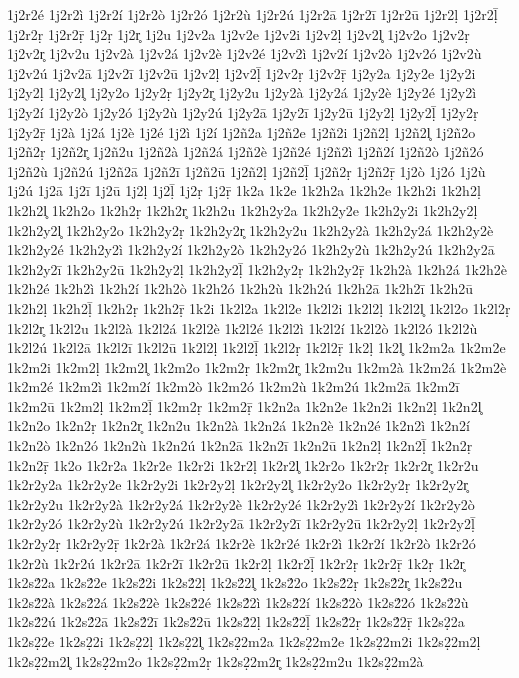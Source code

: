 {1j2r2é
1j2r2ì
1j2r2í
1j2r2ò
1j2r2ó
1j2r2ù
1j2r2ú
1j2r2ā
1j2r2ī
1j2r2ū
1j2r2ḷ
1j2r2ḹ
1j2r2ṛ
1j2r2ṝ
1j2ṛ
1j2r̥
1j2u
1j2v2a
1j2v2e
1j2v2i
1j2v2ḷ
1j2v2l̥
1j2v2o
1j2v2ṛ
1j2v2r̥
1j2v2u
1j2v2à
1j2v2á
1j2v2è
1j2v2é
1j2v2ì
1j2v2í
1j2v2ò
1j2v2ó
1j2v2ù
1j2v2ú
1j2v2ā
1j2v2ī
1j2v2ū
1j2v2ḷ
1j2v2ḹ
1j2v2ṛ
1j2v2ṝ
1j2y2a
1j2y2e
1j2y2i
1j2y2ḷ
1j2y2l̥
1j2y2o
1j2y2ṛ
1j2y2r̥
1j2y2u
1j2y2à
1j2y2á
1j2y2è
1j2y2é
1j2y2ì
1j2y2í
1j2y2ò
1j2y2ó
1j2y2ù
1j2y2ú
1j2y2ā
1j2y2ī
1j2y2ū
1j2y2ḷ
1j2y2ḹ
1j2y2ṛ
1j2y2ṝ
1j2à
1j2á
1j2è
1j2é
1j2ì
1j2í
1j2ñ2a
1j2ñ2e
1j2ñ2i
1j2ñ2ḷ
1j2ñ2l̥
1j2ñ2o
1j2ñ2ṛ
1j2ñ2r̥
1j2ñ2u
1j2ñ2à
1j2ñ2á
1j2ñ2è
1j2ñ2é
1j2ñ2ì
1j2ñ2í
1j2ñ2ò
1j2ñ2ó
1j2ñ2ù
1j2ñ2ú
1j2ñ2ā
1j2ñ2ī
1j2ñ2ū
1j2ñ2ḷ
1j2ñ2ḹ
1j2ñ2ṛ
1j2ñ2ṝ
1j2ò
1j2ó
1j2ù
1j2ú
1j2ā
1j2ī
1j2ū
1j2ḷ
1j2ḹ
1j2ṛ
1j2ṝ
1k2a
1k2e
1k2h2a
1k2h2e
1k2h2i
1k2h2ḷ
1k2h2l̥
1k2h2o
1k2h2ṛ
1k2h2r̥
1k2h2u
1k2h2y2a
1k2h2y2e
1k2h2y2i
1k2h2y2ḷ
1k2h2y2l̥
1k2h2y2o
1k2h2y2ṛ
1k2h2y2r̥
1k2h2y2u
1k2h2y2à
1k2h2y2á
1k2h2y2è
1k2h2y2é
1k2h2y2ì
1k2h2y2í
1k2h2y2ò
1k2h2y2ó
1k2h2y2ù
1k2h2y2ú
1k2h2y2ā
1k2h2y2ī
1k2h2y2ū
1k2h2y2ḷ
1k2h2y2ḹ
1k2h2y2ṛ
1k2h2y2ṝ
1k2h2à
1k2h2á
1k2h2è
1k2h2é
1k2h2ì
1k2h2í
1k2h2ò
1k2h2ó
1k2h2ù
1k2h2ú
1k2h2ā
1k2h2ī
1k2h2ū
1k2h2ḷ
1k2h2ḹ
1k2h2ṛ
1k2h2ṝ
1k2i
1k2l2a
1k2l2e
1k2l2i
1k2l2ḷ
1k2l2l̥
1k2l2o
1k2l2ṛ
1k2l2r̥
1k2l2u
1k2l2à
1k2l2á
1k2l2è
1k2l2é
1k2l2ì
1k2l2í
1k2l2ò
1k2l2ó
1k2l2ù
1k2l2ú
1k2l2ā
1k2l2ī
1k2l2ū
1k2l2ḷ
1k2l2ḹ
1k2l2ṛ
1k2l2ṝ
1k2ḷ
1k2l̥
1k2m2a
1k2m2e
1k2m2i
1k2m2ḷ
1k2m2l̥
1k2m2o
1k2m2ṛ
1k2m2r̥
1k2m2u
1k2m2à
1k2m2á
1k2m2è
1k2m2é
1k2m2ì
1k2m2í
1k2m2ò
1k2m2ó
1k2m2ù
1k2m2ú
1k2m2ā
1k2m2ī
1k2m2ū
1k2m2ḷ
1k2m2ḹ
1k2m2ṛ
1k2m2ṝ
1k2n2a
1k2n2e
1k2n2i
1k2n2ḷ
1k2n2l̥
1k2n2o
1k2n2ṛ
1k2n2r̥
1k2n2u
1k2n2à
1k2n2á
1k2n2è
1k2n2é
1k2n2ì
1k2n2í
1k2n2ò
1k2n2ó
1k2n2ù
1k2n2ú
1k2n2ā
1k2n2ī
1k2n2ū
1k2n2ḷ
1k2n2ḹ
1k2n2ṛ
1k2n2ṝ
1k2o
1k2r2a
1k2r2e
1k2r2i
1k2r2ḷ
1k2r2l̥
1k2r2o
1k2r2ṛ
1k2r2r̥
1k2r2u
1k2r2y2a
1k2r2y2e
1k2r2y2i
1k2r2y2ḷ
1k2r2y2l̥
1k2r2y2o
1k2r2y2ṛ
1k2r2y2r̥
1k2r2y2u
1k2r2y2à
1k2r2y2á
1k2r2y2è
1k2r2y2é
1k2r2y2ì
1k2r2y2í
1k2r2y2ò
1k2r2y2ó
1k2r2y2ù
1k2r2y2ú
1k2r2y2ā
1k2r2y2ī
1k2r2y2ū
1k2r2y2ḷ
1k2r2y2ḹ
1k2r2y2ṛ
1k2r2y2ṝ
1k2r2à
1k2r2á
1k2r2è
1k2r2é
1k2r2ì
1k2r2í
1k2r2ò
1k2r2ó
1k2r2ù
1k2r2ú
1k2r2ā
1k2r2ī
1k2r2ū
1k2r2ḷ
1k2r2ḹ
1k2r2ṛ
1k2r2ṝ
1k2ṛ
1k2r̥
1k2s2́2a
1k2s2́2e
1k2s2́2i
1k2s2́2ḷ
1k2s2́2l̥
1k2s2́2o
1k2s2́2ṛ
1k2s2́2r̥
1k2s2́2u
1k2s2́2à
1k2s2́2á
1k2s2́2è
1k2s2́2é
1k2s2́2ì
1k2s2́2í
1k2s2́2ò
1k2s2́2ó
1k2s2́2ù
1k2s2́2ú
1k2s2́2ā
1k2s2́2ī
1k2s2́2ū
1k2s2́2ḷ
1k2s2́2ḹ
1k2s2́2ṛ
1k2s2́2ṝ
1k2s2̣2a
1k2s2̣2e
1k2s2̣2i
1k2s2̣2ḷ
1k2s2̣2l̥
1k2s2̣2m2a
1k2s2̣2m2e
1k2s2̣2m2i
1k2s2̣2m2ḷ
1k2s2̣2m2l̥
1k2s2̣2m2o
1k2s2̣2m2ṛ
1k2s2̣2m2r̥
1k2s2̣2m2u
1k2s2̣2m2à
}
